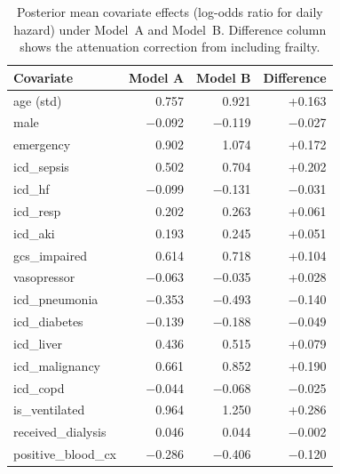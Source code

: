 \begin{table}[t]
\centering
\small
\caption{Posterior mean covariate effects (log-odds ratio for daily hazard) under Model~A and Model~B. Difference column shows the attenuation correction from including frailty.}
\label{tab:beta-comparison}
\begin{tabular}{lrrr}
\toprule
\textbf{Covariate} & \textbf{Model A} & \textbf{Model B} & \textbf{Difference} \\
\midrule
\rowcolor{rowgray} age (std) & 0.757 & 0.921 & +0.163 \\
male & $-$0.092 & $-$0.119 & $-$0.027 \\
\rowcolor{rowgray} emergency & 0.902 & 1.074 & +0.172 \\
icd\_sepsis & 0.502 & 0.704 & +0.202 \\
\rowcolor{rowgray} icd\_hf & $-$0.099 & $-$0.131 & $-$0.031 \\
icd\_resp & 0.202 & 0.263 & +0.061 \\
\rowcolor{rowgray} icd\_aki & 0.193 & 0.245 & +0.051 \\
gcs\_impaired & 0.614 & 0.718 & +0.104 \\
\rowcolor{rowgray} vasopressor & $-$0.063 & $-$0.035 & +0.028 \\
icd\_pneumonia & $-$0.353 & $-$0.493 & $-$0.140 \\
\rowcolor{rowgray} icd\_diabetes & $-$0.139 & $-$0.188 & $-$0.049 \\
icd\_liver & 0.436 & 0.515 & +0.079 \\
\rowcolor{rowgray} icd\_malignancy & 0.661 & 0.852 & +0.190 \\
icd\_copd & $-$0.044 & $-$0.068 & $-$0.025 \\
\rowcolor{rowgray} is\_ventilated & 0.964 & 1.250 & +0.286 \\
received\_dialysis & 0.046 & 0.044 & $-$0.002 \\
\rowcolor{rowgray} positive\_blood\_cx & $-$0.286 & $-$0.406 & $-$0.120 \\
\bottomrule
\end{tabular}
\end{table}
